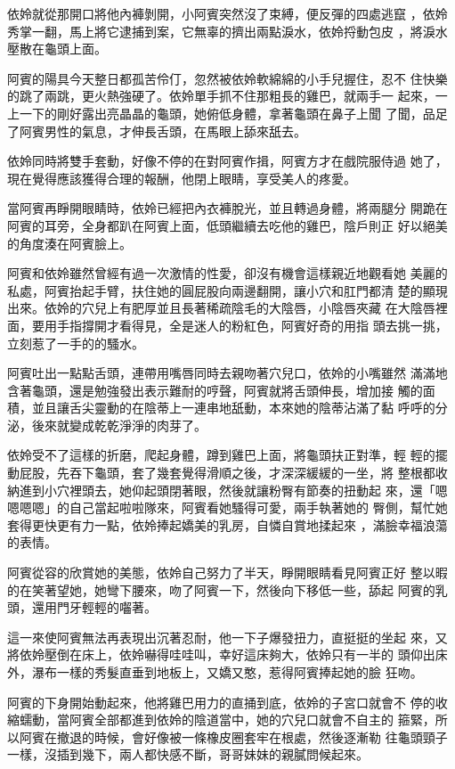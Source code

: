 依姈就從那開口將他內褲剝開，小阿賓突然沒了束縛，便反彈的四處逃竄
，依姈秀掌一翻，馬上將它逮捕到案，它無辜的擠出兩點淚水，依姈捋動包皮
，將淚水壓散在龜頭上面。

阿賓的陽具今天整日都孤苦伶仃，忽然被依姈軟綿綿的小手兒握住，忍不
住快樂的跳了兩跳，更火熱強硬了。依姈單手抓不住那粗長的雞巴，就兩手一
起來，一上一下的剛好露出亮晶晶的龜頭，她俯低身體，拿著龜頭在鼻子上聞
了聞，品足了阿賓男性的氣息，才伸長舌頭，在馬眼上舔來舐去。

依姈同時將雙手套動，好像不停的在對阿賓作揖，阿賓方才在戲院服侍過
她了，現在覺得應該獲得合理的報酬，他閉上眼睛，享受美人的疼愛。

當阿賓再睜開眼睛時，依姈已經把內衣褲脫光，並且轉過身體，將兩腿分
開跪在阿賓的耳旁，全身都趴在阿賓上面，低頭繼續去吃他的雞巴，陰戶則正
好以絕美的角度湊在阿賓臉上。

阿賓和依姈雖然曾經有過一次激情的性愛，卻沒有機會這樣親近地觀看她
美麗的私處，阿賓抬起手臂，扶住她的圓屁股向兩邊翻開，讓小穴和肛門都清
楚的顯現出來。依姈的穴兒上有肥厚並且長著稀疏陰毛的大陰唇，小陰唇夾藏
在大陰唇裡面，要用手指撐開才看得見，全是迷人的粉紅色，阿賓好奇的用指
頭去挑一挑，立刻惹了一手的的騷水。

阿賓吐出一點點舌頭，連帶用嘴唇同時去親吻著穴兒口，依姈的小嘴雖然
滿滿地含著龜頭，還是勉強發出表示難耐的哼聲，阿賓就將舌頭伸長，增加接
觸的面積，並且讓舌尖靈動的在陰蒂上一連串地舐動，本來她的陰蒂沾滿了黏
呼呼的分泌，後來就變成乾乾淨淨的肉芽了。

依姈受不了這樣的折磨，爬起身體，蹲到雞巴上面，將龜頭扶正對準，輕
輕的擺動屁股，先吞下龜頭，套了幾套覺得滑順之後，才深深緩緩的一坐，將
整根都收納進到小穴裡頭去，她仰起頭閉著眼，然後就讓粉臀有節奏的扭動起
來，還「嗯嗯嗯嗯」的自己當起啦啦隊來，阿賓看她騷得可愛，兩手執著她的
臀側，幫忙她套得更快更有力一點，依姈捧起嬌美的乳房，自憐自賞地揉起來
，滿臉幸福浪蕩的表情。

阿賓從容的欣賞她的美態，依姈自己努力了半天，睜開眼睛看見阿賓正好
整以暇的在笑著望她，她彎下腰來，吻了阿賓一下，然後向下移低一些，舔起
阿賓的乳頭，還用門牙輕輕的囓著。

這一來使阿賓無法再表現出沉著忍耐，他一下子爆發扭力，直挺挺的坐起
來，又將依姈壓倒在床上，依姈嚇得哇哇叫，幸好這床夠大，依姈只有一半的
頭仰出床外，瀑布一樣的秀髮直垂到地板上，又嬌又憨，惹得阿賓捧起她的臉
狂吻。

阿賓的下身開始動起來，他將雞巴用力的直捅到底，依姈的子宮口就會不
停的收縮蠕動，當阿賓全部都進到依姈的陰道當中，她的穴兒口就會不自主的
箍緊，所以阿賓在撤退的時候，會好像被一條橡皮圈套牢在根處，然後逐漸勒
往龜頭頸子一樣，沒插到幾下，兩人都快感不斷，哥哥妹妹的親膩問候起來。


